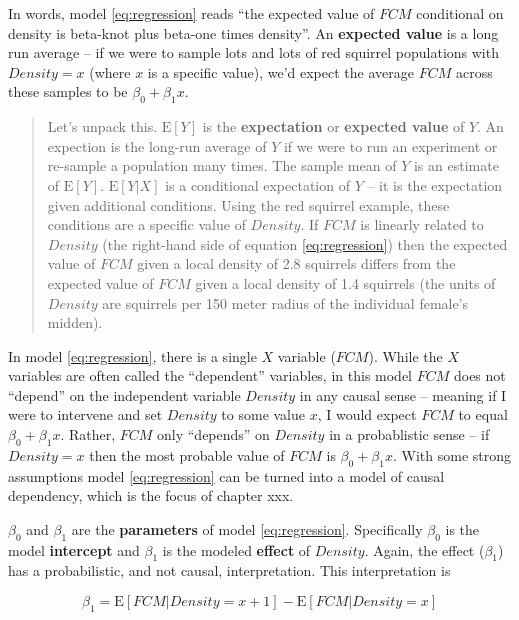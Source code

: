 \documentclass[]{book}
\begin{document}
In words, model \eqref{eq:regression} reads ``the expected value of
\(FCM\) conditional on density is beta-knot plus beta-one times
density''. An \textbf{expected value} is a long run average -- if we
were to sample lots and lots of red squirrel populations with
\(Density=x\) (where \(x\) is a specific value), we'd expect the average
\(FCM\) across these samples to be \(\beta_0 + \beta_1 x\).

\begin{quote}
Let's unpack this. \(\textrm{E}[Y]\) is the \textbf{expectation} or
\textbf{expected value} of \(Y\). An expection is the long-run average
of \(Y\) if we were to run an experiment or re-sample a population many
times. The sample mean of \(Y\) is an estimate of \(\textrm{E}[Y]\).
\(\textrm{E}[Y|X]\) is a conditional expectation of \(Y\) -- it is the
expectation given additional conditions. Using the red squirrel example,
these conditions are a specific value of \(Density\). If \(FCM\) is
linearly related to \(Density\) (the right-hand side of equation
\eqref{eq:regression}) then the expected value of \(FCM\) given a local
density of 2.8 squirrels differs from the expected value of \(FCM\)
given a local density of 1.4 squirrels (the units of \(Density\) are
squirrels per 150 meter radius of the individual female's midden).
\end{quote}

In model \eqref{eq:regression}, there is a single \(X\) variable
(\(FCM\)). While the \(X\) variables are often called the ``dependent''
variables, in this model \(FCM\) does not ``depend'' on the independent
variable \(Density\) in any causal sense -- meaning if I were to
intervene and set \(Density\) to some value \(x\), I would expect
\(FCM\) to equal \(\beta_0 + \beta_1 x\). Rather, \(FCM\) only
``depends'' on \(Density\) in a probablistic sense -- if \(Density = x\)
then the most probable value of \(FCM\) is \(\beta_0 + \beta_1 x\). With
some strong assumptions model \eqref{eq:regression} can be turned into a
model of causal dependency, which is the focus of chapter xxx.

\(\beta_0\) and \(\beta_1\) are the \textbf{parameters} of model
\eqref{eq:regression}. Specifically \(\beta_0\) is the model
\textbf{intercept} and \(\beta_1\) is the modeled \textbf{effect} of
\(Density\). Again, the effect (\(\beta_1\)) has a probabilistic, and
not causal, interpretation. This interpretation is

\begin{equation}
\beta_1 = \textrm{E}[FCM|Density=x+1] - \textrm{E}[FCM|Density=x] 
\label{eq:beta1}
\end{equation}
\end{document}
